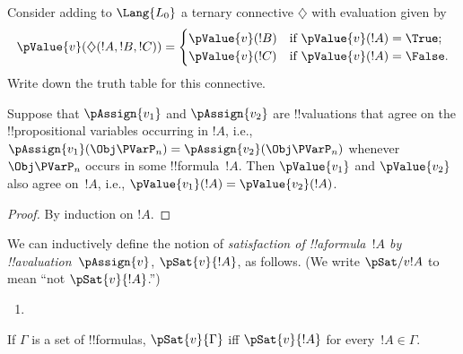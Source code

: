 \documentclass[../../../include/open-logic-section]{subfiles}
\begin{document}
\begin{prob}
Consider adding to $\Lang{L_0}$ a ternary connective $\diamondsuit$
with evaluation given by
\begin{gather*}
  \pValue{v}(\diamondsuit( !A , !B , !C ) ) = \begin{cases}
    \pValue{v}( !B ) &
    \text{if $\pValue{v}(!A) = \True$;}\\
    \pValue{v}( !C ) &
    \text{if $\pValue{v}(!A) = \False $}.
  \end{cases}
\end{gather*}
Write down the truth table for this connective.
\end{prob}

\begin{thm}
 Suppose that $\pAssign{v_1}$ and
$\pAssign{v_2}$ are !!{valuation}s that agree on the !!{propositional
variable}s occurring in $!A$, i.e., $\pAssign{v_1}(\Obj \PVarP_n) =
\pAssign{v_2}(\Obj \PVarP_n)$ whenever $\Obj \PVarP_n$ occurs in some
!!{formula}~$!A$. Then $\pValue{v_1}$ and $\pValue{v_2}$ also agree
on~$!A$, i.e., $\pValue{v_1}(!A) = \pValue{v_2}(!A)$.
\end{thm}

\begin{proof}
By induction on $!A$.
\end{proof}

\begin{defn}[Satisfaction]
 We can inductively define the notion of
  \emph{satisfaction of !!a{formula}~$!A$ by
  !!a{valuation}~$\pAssign{v}$}, $\pSat{v}{!A}$, as follows.
  (We write $\pSat/{v}{!A}$ to mean ``not $\pSat{v}{!A}$.'')
\begin{enumerate}


\item {}





\end{enumerate}
If $\Gamma$ is a set of !!{formula}s, $\pSat{v}{\Gamma}$ iff
$\pSat{v}{!A}$ for every~$!A \in \Gamma$.
\end{defn}
\end{document}
